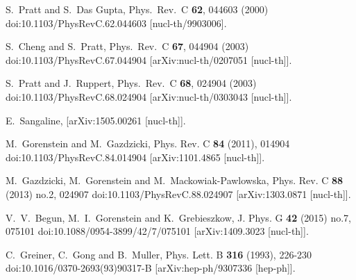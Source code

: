 \begin{thebibliography}{99}
  S.~Pratt and S.~Das Gupta,
  Phys.\ Rev.\ C {\bf 62}, 044603 (2000)
  doi:10.1103/PhysRevC.62.044603
  [nucl-th/9903006].

S.~Cheng and S.~Pratt,
Phys.\ Rev.\ C \textbf{67}, 044904 (2003)
doi:10.1103/PhysRevC.67.044904
[arXiv:nucl-th/0207051 [nucl-th]].

S.~Pratt and J.~Ruppert,
Phys.\ Rev.\ C \textbf{68}, 024904 (2003)
doi:10.1103/PhysRevC.68.024904
[arXiv:nucl-th/0303043 [nucl-th]].

E.~Sangaline,
[arXiv:1505.00261 [nucl-th]].

M.~Gorenstein and M.~Gazdzicki,
Phys. Rev. C \textbf{84} (2011), 014904
doi:10.1103/PhysRevC.84.014904
[arXiv:1101.4865 [nucl-th]].

M.~Gazdzicki, M.~Gorenstein and M.~Mackowiak-Pawlowska,
Phys. Rev. C \textbf{88} (2013) no.2, 024907
doi:10.1103/PhysRevC.88.024907
[arXiv:1303.0871 [nucl-th]].

V.~V.~Begun, M.~I.~Gorenstein and K.~Grebieszkow,
J. Phys. G \textbf{42} (2015) no.7, 075101
doi:10.1088/0954-3899/42/7/075101
[arXiv:1409.3023 [nucl-th]].

C.~Greiner, C.~Gong and B.~Muller,
Phys. Lett. B \textbf{316} (1993), 226-230
doi:10.1016/0370-2693(93)90317-B
[arXiv:hep-ph/9307336 [hep-ph]].


\end{thebibliography}
